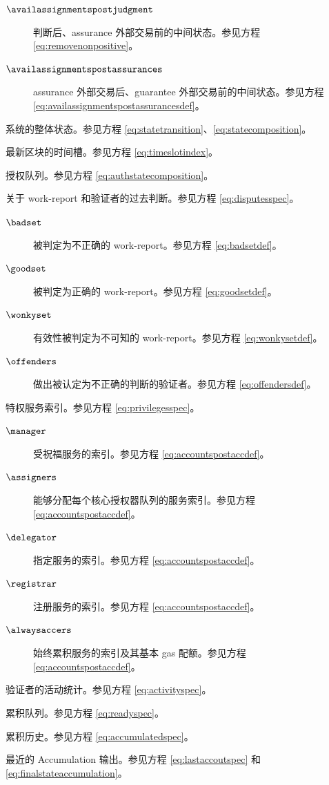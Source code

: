 \begin{description}
  \begin{description}
    \item[$\availassignmentspostjudgment$] 判断后、assurance 外部交易前的中间状态。参见方程 \ref{eq:removenonpositive}。
    \item[$\availassignmentspostassurances$] assurance 外部交易后、guarantee 外部交易前的中间状态。参见方程 \ref{eq:availassignmentspostassurancesdef}。
  \end{description}
  \item[$\thestate$] 系统的整体状态。参见方程 \ref{eq:statetransition}、\ref{eq:statecomposition}。
  \item[$\thetime$] 最新区块的时间槽。参见方程 \ref{eq:timeslotindex}。
  \item[$\authqueue$] 授权队列。参见方程 \ref{eq:authstatecomposition}。
  \item[$\disputes$] 关于 work-report 和验证者的过去判断。参见方程 \ref{eq:disputesspec}。
  \begin{description}
    \item[$\badset$] 被判定为不正确的 work-report。参见方程 \ref{eq:badsetdef}。
    \item[$\goodset$] 被判定为正确的 work-report。参见方程 \ref{eq:goodsetdef}。
    \item[$\wonkyset$] 有效性被判定为不可知的 work-report。参见方程 \ref{eq:wonkysetdef}。
    \item[$\offenders$] 做出被认定为不正确的判断的验证者。参见方程 \ref{eq:offendersdef}。
  \end{description}
  \item[$\privileges$] 特权服务索引。参见方程 \ref{eq:privilegesspec}。
  \begin{description}
    \item[$\manager$] 受祝福服务的索引。参见方程 \ref{eq:accountspostaccdef}。
    \item[$\assigners$] 能够分配每个核心授权器队列的服务索引。参见方程 \ref{eq:accountspostaccdef}。
    \item[$\delegator$] 指定服务的索引。参见方程 \ref{eq:accountspostaccdef}。
    \item[$\registrar$] 注册服务的索引。参见方程 \ref{eq:accountspostaccdef}。
    \item[$\alwaysaccers$] 始终累积服务的索引及其基本 gas 配额。参见方程 \ref{eq:accountspostaccdef}。
  \end{description}
  \item[$\activity$] 验证者的活动统计。参见方程 \ref{eq:activityspec}。
  \item[$\ready$] 累积队列。参见方程 \ref{eq:readyspec}。
  \item[$\accumulated$] 累积历史。参见方程 \ref{eq:accumulatedspec}。
  \item[$\lastaccout$] 最近的 Accumulation 输出。参见方程 \ref{eq:lastaccoutspec} 和 \ref{eq:finalstateaccumulation}。
\end{description}

